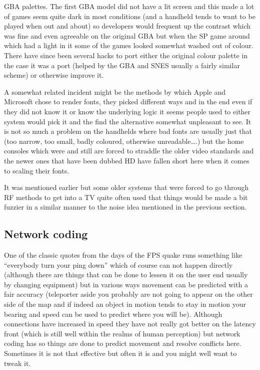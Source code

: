 \documentclass[
]{book}
\begin{document}
GBA palettes. The first GBA model did not have a lit screen and this made a lot of games seem quite dark in most conditions (and a handheld tends to want to be played when out and about) so developers would frequent up the contrast which was fine and even agreeable on the original GBA but when the SP game around which had a light in it some of the games looked somewhat washed out of colour. There have since been several hacks to port either the original colour palette in the case it was a port (helped by the GBA and SNES usually a fairly similar scheme) or otherwise improve it.

A somewhat related incident might be the methods by which Apple and Microsoft chose to render fonts, they picked different ways and in the end even if they did not know it or know the underlying logic it seems people used to either system would pick it and the find the alternative somewhat unpleasant to see. It is not so much a problem on the handhelds where bad fonts are usually just that (too narrow, too small, badly coloured, otherwise unreadable\ldots.) but the home consoles which were and still are forced to straddle the older video standards and the newer ones that have been dubbed HD have fallen short here when it comes to scaling their fonts.

It was mentioned earlier but some older systems that were forced to go through RF methods to get into a TV quite often used that things would be made a bit fuzzier in a similar manner to the noise idea mentioned in the previous section.

\hypertarget{network-coding}{%
\subsection{Network coding}\label{network-coding}}

One of the classic quotes from the days of the FPS quake runs something like ``everybody turn your ping down'' which of course can not happen directly (although there are things that can be done to lessen it on the user end usually by changing equipment) but in various ways movement can be predicted with a fair accuracy (teleporter aside you probably are not going to appear on the other side of the map and if indeed an object in motion tends to stay in motion your bearing and speed can be used to predict where you will be). Although connections have increased in speed they have not really got better on the latency front (which is still well within the realms of human perception) but network coding has so things are done to predict movement and resolve conflicts here. Sometimes it is not that effective but often it is and you might well want to tweak it.
\end{document}
